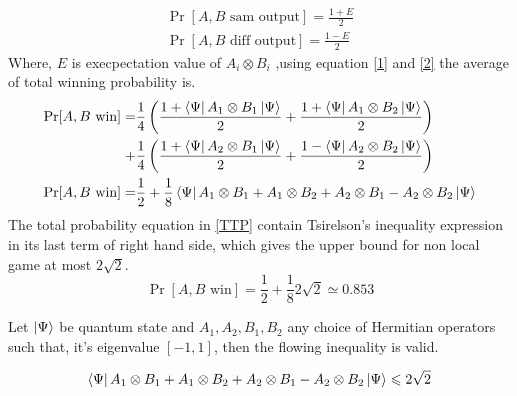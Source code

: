 
\begin{align}
\Pr[A,B \text{ sam output}]=\frac{1+E}{2}\label{1}\\
\Pr[A,B \text{ diff output}]=\frac{1-E}{2}\label{2}
\end{align}
Where, $E$ is execpectation value of $A_i\otimes B_i$ ,using equation \ref{1} and \ref{2} the average of  total  winning probability is.
\begin{align}\label{TTP}
\Pr[A,B \text{ win}]=&\frac{1}{4}\left(\frac{1+\bra{\Psi}A_1\otimes B_1\ket{\Psi}}{2}
+\frac{1+\bra{\Psi}A_1\otimes B_2\ket{\Psi}}{2}\right)\nonumber\\
+&\frac{1}{4}\left(\frac{1+\bra{\Psi}A_2\otimes B_1\ket{\Psi}}{2}+\frac{1-\bra{\Psi}A_2\otimes B_2\ket{\Psi}}{2}\right)\nonumber\\
\Pr[A,B \text{ win}]=&\frac{1}{2}+\frac{1}{8}\bra{\Psi}A_1\otimes B_1+ A_1\otimes B_2+A_2\otimes B_1 -A_2\otimes B_2\ket{\Psi}
\end{align}
The total probability equation in \ref{TTP} contain  Tsirelson’s inequality expression in its last term of right hand side, which gives the upper bound for non local  game at most $2\sqrt{2}$.
\begin{equation}
\Pr[A,B \text{ win}]=\frac{1}{2}+\frac{1}{8} 2\sqrt{2} \simeq 0.853
\end{equation}
\begin{theorem}
\label{thmTsireslonInequality}

Let $\ket{\Psi}$ be quantum state and $A_1,A_2, B_1,B_2$ any choice of Hermitian operators such that, it's eigenvalue $\left[-1,1\right]$, then the flowing  inequality is valid.

\begin{align}
\bra{\Psi}A_1\otimes B_1+ A_1\otimes B_2+A_2\otimes B_1 -A_2\otimes B_2\ket{\Psi}\leqslant 2\sqrt{2}\label{TE}
\end{align}

\end{theorem}


